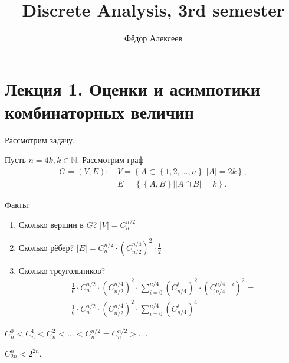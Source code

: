 



\title{Discrete Analysis, 3rd semester}

\author{Фёдор Алексеев}

\maketitle
\tableofcontents\newpage{}

\part{Лекция 1. Оценки и асимпотики комбинаторных величин}

\begin{example} Рассмотрим задачу.

  Пусть $n = 4k, k \in \mathbb{N}$. Рассмотрим граф 
  \begin{align*}
	G = (V,E)\mbox{: } &V = \left\{A \subset \left\{1, 2, \ldots, n\right\}| |A| = 2k\right\}, \\
	&E = \left\{ \left\{ A,B \right\}| |A \cap B| = k \right\}.
  \end{align*}

  Факты:
  \begin{enumerate}
	\item Сколько вершин в $G$? $|V| = C_n^{n/2}$
	\item Сколько рёбер? $|E| = C_n^{n/2} \cdot \left( C_{n/2}^{n/4} \right)^2 \cdot \frac{1}{2}$
	\item Сколько треугольников? 
	  \begin{align*}
		&\frac{1}{6} \cdot C_n^{n/2} \cdot \left( C_{n/2}^{n/4} \right)^2 \cdot 
		\sum_{i=0}^{n/4}\left( C_{n/4}^{i} \right)^2 \cdot \left( C_{n/4}^{n/4-i} \right)^2 = \\
		&\frac{1}{6} \cdot C_n^{n/2} \cdot \left( C_{n/2}^{n/4} \right)^2 \cdot \sum_{i=0}^{n/4}\left( C_{n/4}^{i} \right)^4
	  \end{align*}
  \end{enumerate}
\end{example}

\begin{claim}
  \(
	C_{n}^{0} < C_{n}^{1} < C_{n}^{2} < \ldots < C_{n}^{n/2} = C_{n}^{n/2} > \ldots
  \).
\end{claim}

\begin{claim}
  $C_{2n}^{n} < 2^{2n}$.
\end{claim}

